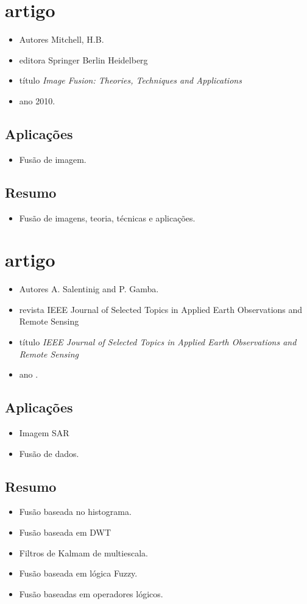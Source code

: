 \documentclass{article}
\begin{document}
\section{artigo \cite{mit}}
\begin{itemize}
\item Autores Mitchell, H.B.
\item editora  Springer Berlin Heidelberg
\item título \textit{Image Fusion: Theories, Techniques and Applications}
\item ano 2010.
\end{itemize}
\subsection{Aplicações}
\begin{itemize}
\item Fusão de imagem.
\end{itemize}
\subsection{Resumo}
\begin{itemize}
\item Fusão de imagens, teoria, técnicas e aplicações.
\end{itemize}


\section{artigo \cite{sg}}
\begin{itemize}
\item Autores A. Salentinig and P. Gamba.
\item revista IEEE Journal of Selected Topics in Applied Earth Observations and Remote Sensing
\item título \textit{IEEE Journal of Selected Topics in Applied Earth Observations and Remote Sensing}
\item ano .
\end{itemize}
\subsection{Aplicações}
\begin{itemize}
\item Imagem SAR
\item Fusão de dados.
\end{itemize}
\subsection{Resumo}
\begin{itemize}
\item Fusão baseada no histograma.
\item Fusão baseada em DWT
\item Filtros de Kalmam de multiescala.
\item Fusão baseada em lógica Fuzzy.
\item Fusão baseadas em operadores lógicos.
\end{itemize}
\end{document}
